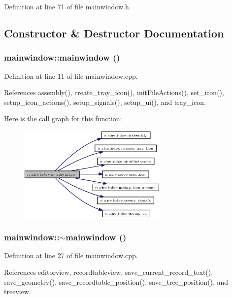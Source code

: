 Definition at line 71 of file mainwindow.h.

\subsection{Constructor \& Destructor Documentation}
\subsubsection{\setlength{\rightskip}{0pt plus 5cm}mainwindow::mainwindow ()}\label{classmainwindow_b3362dc64d962bffa152d883b3de8a29}




Definition at line 11 of file mainwindow.cpp.

References assembly(), create\_\-tray\_\-icon(), init\-File\-Actions(), set\_\-icon(), setup\_\-icon\_\-actions(), setup\_\-signals(), setup\_\-ui(), and tray\_\-icon.

Here is the call graph for this function:\begin{figure}[H]
\begin{center}
\leavevmode
\includegraphics[width=208pt]{classmainwindow_b3362dc64d962bffa152d883b3de8a29_cgraph}
\end{center}
\end{figure}
\subsubsection{\setlength{\rightskip}{0pt plus 5cm}mainwindow::$\sim$mainwindow ()}\label{classmainwindow_5443e012964c892ef6015e7cebf62a67}




Definition at line 27 of file mainwindow.cpp.

References editorview, recordtableview, save\_\-current\_\-record\_\-text(), save\_\-geometry(), save\_\-recordtable\_\-position(), save\_\-tree\_\-position(), and treeview.

